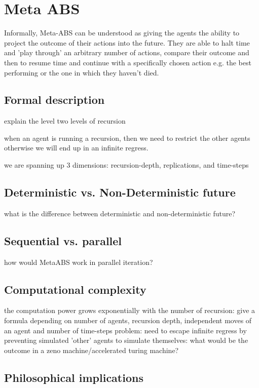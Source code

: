 \section{Meta ABS}
Informally, Meta-ABS can be understood as giving the agents the ability to project the outcome of their actions into the future. They are able to halt time and 'play through' an arbitrary number of actions, compare their outcome and then to resume time and continue with a specifically chosen action e.g. the best performing or the one in which they haven't died.

\subsection{Formal description}
explain the level two levels of recursion

when an agent is running a recursion, then we need to restrict the other agents otherwise we will end up in an infinite regress.

we are spanning up 3 dimensions: recursion-depth, replications, and time-steps

\subsection{Deterministic vs. Non-Deterministic future}
what is the difference between deterministic and non-deterministic future?

\subsection{Sequential vs. parallel}
how would MetaABS work in parallel iteration?

\subsection{Computational complexity}
the computation power grows exponentially with the number of recursion: give a formula depending on number of agents, recursion depth, independent moves of an agent and number of time-steps 
problem: need to escape infinite regress by preventing simulated 'other' agents to simulate themselves: what would be the outcome in a zeno machine/accelerated turing machine?


\subsection{Philosophical implications}

